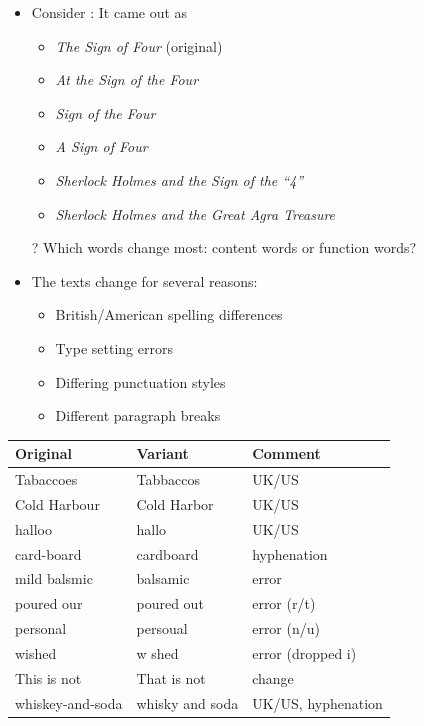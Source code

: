 \documentclass[a4paper,landscape,headrule,footrule,xetex]{foils}
\begin{document}
\begin{itemize}
\item Consider : It came out as
  \begin{itemize}
  \item \textit{The Sign of Four} \hfill (original)
  \item \textit{At the Sign of the Four}
  \item \textit{Sign of the Four}  
  \item \textit{A Sign of Four}
  \item \textit{Sherlock Holmes and the Sign of the ``4''}
  \item \textit{Sherlock Holmes and the Great Agra Treasure}
  \end{itemize}
\item[?] Which words change most: content words or function words? \task
\item The texts change for several reasons:
  \begin{itemize}
    \item British/American spelling differences
    \item Type setting errors
    \item Differing punctuation styles
    \item Different paragraph breaks
  \end{itemize}
\end{itemize}


\begin{tabular}{lll}
  Original & Variant & Comment \\
\hline
  Tabaccoes & Tabbaccos & UK/US \\
  Cold Harbour &  Cold Harbor & UK/US \\
  halloo & hallo  & UK/US \\
  card-board & cardboard & hyphenation \\
  mild balsmic & balsamic & error \\
  poured our & poured out & error (r/t)\\
  personal & persoual & error (n/u)\\
  wished & w shed & error (dropped i)\\
  This is not & That is not & change \\
  whiskey-and-soda & whisky and soda &  UK/US, hyphenation \\
\end{tabular}
\end{document}
